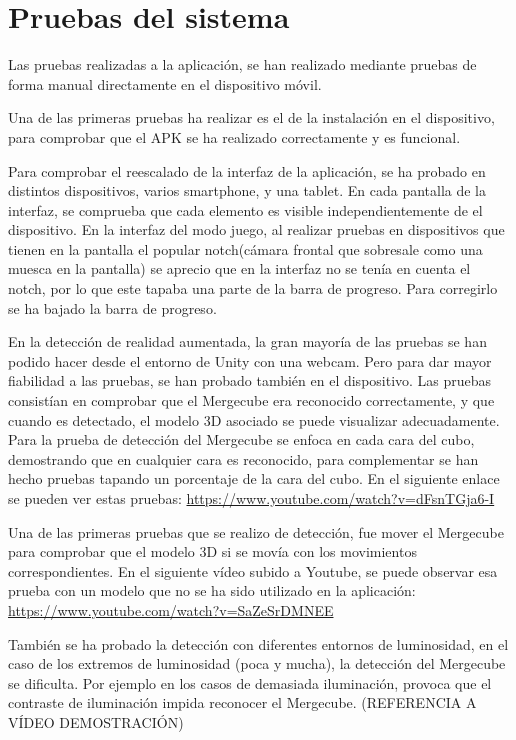 \section{Pruebas del sistema}
Las pruebas realizadas a la aplicación, se han realizado mediante pruebas de forma manual directamente en el dispositivo móvil.

Una de las primeras pruebas ha realizar es el de la instalación en el dispositivo, para comprobar que el APK se ha realizado correctamente y es funcional. 

Para comprobar el reescalado de la interfaz de la aplicación, se ha probado en distintos dispositivos, varios smartphone, y una tablet. En cada pantalla de la interfaz, se comprueba que cada elemento es visible independientemente de el dispositivo.
En la interfaz del modo juego, al realizar pruebas en dispositivos que tienen en la pantalla el popular notch(cámara frontal que sobresale como una muesca en la pantalla) se aprecio que en la interfaz no se tenía en cuenta el notch, por lo que este tapaba una parte de la barra de progreso. Para corregirlo se ha bajado la barra de progreso.

En la detección de realidad aumentada, la gran mayoría de las pruebas se han podido hacer desde el entorno de Unity con una webcam. Pero para dar mayor fiabilidad a las pruebas, se han probado también en el dispositivo. Las pruebas consistían en comprobar que el Mergecube era reconocido correctamente, y que cuando es detectado, el modelo 3D asociado se puede visualizar adecuadamente. Para la prueba de detección del Mergecube se enfoca en cada cara del cubo, demostrando que en cualquier cara es reconocido, para complementar se han hecho pruebas tapando un porcentaje de la cara del cubo. En el siguiente enlace se pueden ver estas pruebas: \url{https://www.youtube.com/watch?v=dFsnTGja6-I}

Una de las primeras pruebas que se realizo de detección, fue mover el Mergecube para comprobar que el modelo 3D si se movía con los movimientos correspondientes. En el siguiente vídeo subido a Youtube, se puede observar esa prueba con un modelo que no se ha sido utilizado en la aplicación: \url{https://www.youtube.com/watch?v=SaZeSrDMNEE}

También se ha probado la detección con diferentes entornos de luminosidad, en el caso de los extremos de luminosidad (poca y mucha), la detección del Mergecube se dificulta. Por ejemplo en los casos de demasiada iluminación, provoca que el contraste de iluminación impida reconocer el Mergecube. 
(REFERENCIA A VÍDEO DEMOSTRACIÓN)

